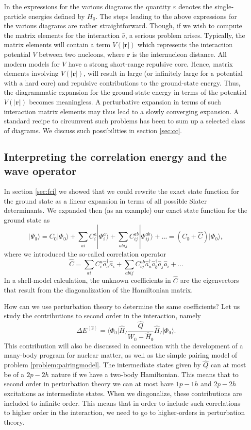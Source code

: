   In the expressions for the various diagrams the quantity $\varepsilon$ denotes the single-particle energies
  defined by $H_0$.  The steps leading to the above expressions for
  the various diagrams are rather straightforward. Though, if we wish
  to compute the matrix elements for the interaction $\hat{v}$, a serious
  problem arises. Typically, the matrix elements will contain a term
  $V(|{\mathbf r}|)$
  which represents the interaction potential $V$ between two nucleons,
  where ${\mathbf r}$ is the internucleon distance.  All modern models
  for $V$ have a strong short-range repulsive core. Hence, matrix
  elements involving $V(|{\mathbf r}|)$, will result in large (or
  infinitely large for a potential with a hard core) and repulsive
  contributions to the ground-state energy. Thus, the diagrammatic
  expansion for the ground-state energy in terms of the potential
  $V(|{\mathbf r}|)$ becomes meaningless. A perturbative expansion in terms of
such interaction matrix elements may thus lead to a slowly converging expansion.
A standard recipe to circumvent such problems has been to sum up 
a selected class of diagrams. We discuss such possibilities in section \ref{sec:cc}.  



  \subsection{Interpreting the correlation energy and the wave operator}

  In section \ref{sec:fci} we showed that we could rewrite the exact state
  function for the ground state as a linear expansion in terms of all
  possible Slater determinants.  We expanded then (as an example) our
  exact state function for the ground state as
  \[
  |\Psi_0\rangle=C_0|\Phi_0\rangle+\sum_{ai}C_i^a|\Phi_i^a\rangle+\sum_{abij}C_{ij}^{ab}|\Phi_{ij}^{ab}\rangle+\dots
  =(C_0+\hat{C})|\Phi_0\rangle,
  \]
  where we introduced the so-called correlation operator
  \[
  \hat{C}=\sum_{ai}C_i^a\hat{a}_{a}^{\dagger}\hat{a}_i
  +\sum_{abij}C_{ij}^{ab}\hat{a}_{a}^{\dagger}\hat{a}_{b}^{\dagger}\hat{a}_j\hat{a}_i+\dots
  \]
  In a shell-model calculation, the unknown coefficients in $\hat{C}$
  are the eigenvectors that result from the diagonalization of the
  Hamiltonian matrix.

  How can we use perturbation theory to determine the same
  coefficients? Let us study the contributions to second order in the
  interaction, namely
  \[
  \Delta E^{(2)}=\langle\Phi_0\vert
  \hat{H}_I\frac{\hat{Q}}{W_0-\hat{H}_0}\hat{H}_I\vert \Phi_0\rangle.
  \]
  This contribution will also be discussed in connection with the
  development of a many-body program for nuclear matter, as well as
  the simple pairing model of problem \ref{problem:pairingmodel}.  The
  intermediate states given by $\hat{Q}$ can at most be of a $2p-2h$
  nature if we have a two-body Hamiltonian. This means that to second
  order in perturbation theory we can at most have $1p-1h$ and $2p-2h$
  excitations as intermediate states. When we diagonalize, these
  contributions are included to infinite order. This means that in
  order to include such correlations to higher order in the
  interaction, we need to go to higher-orders in perturbation theory.

